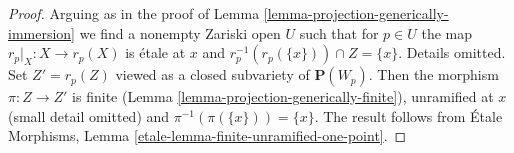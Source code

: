 \documentclass[10pt,a4paper]{amsart}
\theoremstyle{plain}
\theoremstyle{definition}
\theoremstyle{remark}
\numberwithin{equation}{subsection}
\begin{document}
\begin{proof}
Arguing as in the proof of Lemma \ref{lemma-projection-generically-immersion}
we find a nonempty Zariski open $U$ such that for $p \in U$ the map
$r_p|_X : X \to r_p(X)$ is \'etale at $x$ and
$r_p^{-1}(r_p(\{x\})) \cap Z = \{x\}$. Details omitted.
Set $Z' = r_p(Z)$ viewed as a closed subvariety of $\mathbf{P}(W_p)$.
Then the morphism $\pi : Z \to Z'$ is finite
(Lemma \ref{lemma-projection-generically-finite}), unramified at $x$
(small detail omitted) and $\pi^{-1}(\pi(\{x\})) = \{x\}$. The result follows
from \'Etale Morphisms, Lemma \ref{etale-lemma-finite-unramified-one-point}.
\end{proof}
\end{document}
